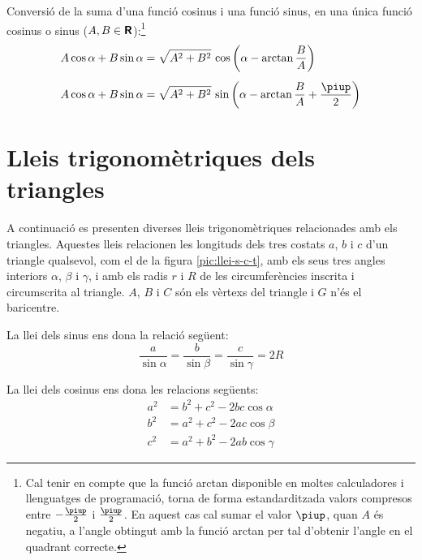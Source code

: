 Conversió de la suma d'una funció cosinus i una funció sinus, en una única
funció cosinus o sinus ($A,B\in{\ensuremath{\boldsymbol{\mathsf{R}}}}$):\footnote{Cal tenir en compte que la funció \textsf{arctan} disponible en moltes calculadores i llenguatges de programació, torna de forma estandarditzada valors compresos entre $-\frac{\piup}{2}$ i $\frac{\piup}{2}$. En aquest cas cal sumar el valor $\piup$, quan $A$ és negatiu, a l'angle obtingut amb la funció \textsf{arctan} per tal d'obtenir l'angle en el quadrant correcte.}
\begin{subequations}
\begin{align}
    A \cos \alpha + B \sin \alpha &= \sqrt{A^2+B^2}\, \cos \left(\alpha - \arctan\dfrac{B}{A}\right)\label{eq:AcosBsin}\\[1ex]
    A \cos \alpha + B \sin \alpha &= \sqrt{A^2+B^2}\, \sin \left(\alpha - \arctan\dfrac{B}{A}+\dfrac{\piup}{2}\right)\label{eq:AcosBsinS}
\end{align}
\end{subequations}


\section{Lleis trigonomètriques dels triangles}\label{sec:llei-s-c-t}

A continuació es presenten diverses lleis trigonomètriques relacionades amb els triangles. Aquestes lleis relacionen les longituds dels tres costats $a$, $b$ i $c$ d'un triangle qualsevol, com el de
la figura \vref{pic:llei-s-c-t}, amb els seus tres angles interiors
$\alpha$, $\beta$ i $\gamma$, i amb els radis $r$ i $R$ de les circumferències inscrita i circumscrita al triangle. $A$, $B$ i $C$ són els vèrtexs del triangle i $G$ n'és el baricentre.

\begin{center}
    
     \label{pic:llei-s-c-t}
\end{center}

La llei dels sinus ens dona la relació següent:
\begin{equation}
    \frac{a}{\sin\alpha} = \frac{b}{\sin\beta} =
    \frac{c}{\sin\gamma} = 2 R
\end{equation}

La llei dels cosinus ens dona les relacions següents:
\begin{subequations}
\begin{align}
    a^2 &= b^2 + c^2 - 2 b c \cos\alpha \\[1ex]
    b^2 &= a^2 + c^2 - 2 a c \cos\beta \\[1ex]
    c^2 &= a^2 + b^2 - 2 a b \cos\gamma
\end{align}
\end{subequations}

